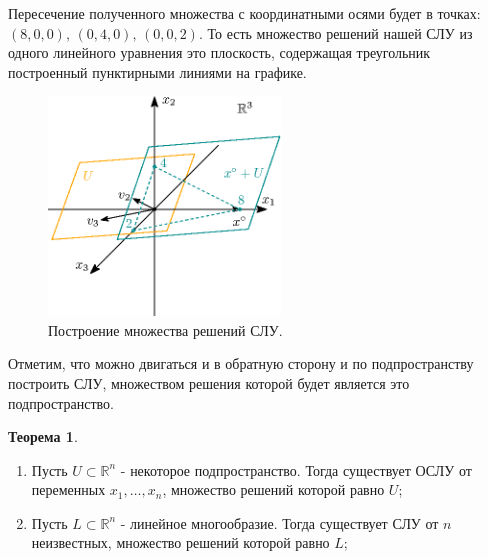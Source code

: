\documentclass[12pt]{article}
\newcommand{\MR}{\mathbb{R}}
\theoremstyle{definition}
\newtheorem{theorem}{Теорема}
\begin{document}
Пересечение полученного множества с координатными осями будет в точках: $(8, 0,0),\, (0,4,0), \, (0,0,2)$. То есть множество решений нашей СЛУ из одного линейного уравнения это плоскость, содержащая треугольник построенный пунктирными линиями на графике.
\begin{figure}[H]
	\centering
	\includegraphics[width=0.55\textwidth]{AL4_3.eps}
	\caption{Построение множества решений СЛУ.}
	\label{4_3}
\end{figure}
\newpage
Отметим, что можно двигаться и в обратную сторону и по подпространству построить СЛУ, множеством решения которой будет является это подпространство.
\begin{theorem}\hfill
	\begin{enumerate}[label=\arabic*)]
		\item Пусть $U \subset \MR^n$ - некоторое подпространство. Тогда существует ОСЛУ от переменных $x_1, \dotsc, x_n$, множество решений которой равно $U$;
		\item Пусть $L \subset \MR^n$ - линейное многообразие. Тогда существует СЛУ от $n$ неизвестных, множество решений которой равно $L$;
	\end{enumerate}
\end{theorem}
\end{document}
